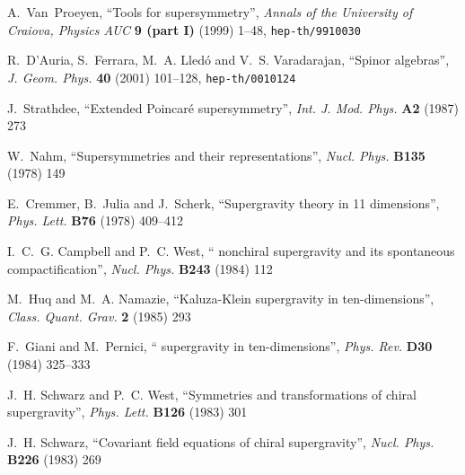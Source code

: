 \documentclass[a4paper,11pt,twoside]{article}
\begin{document}
\providecommand{\href}[2]{#2}\begingroup\raggedright\begin{thebibliography}{10}

{\sc A.~Van~Proeyen}, ``Tools for supersymmetry'',  {\sl Annals of the
  University of Craiova, Physics AUC} {\bf 9 (part I)} (1999) 1--48,
\href{http://www.arXiv.org/abs/hep-th/9910030}{{\tt hep-th/9910030}}

{\sc R.~D'Auria, S.~Ferrara, M.~A. Lled{\'o}  and V.~S. Varadarajan},
``Spinor
  algebras'',  {\sl J. Geom. Phys.} {\bf 40} (2001) 101--128,
\href{http://www.arXiv.org/abs/hep-th/0010124}{{\tt hep-th/0010124}}

{\sc J.~Strathdee}, ``Extended Poincar{\'e} supersymmetry'',  {\sl Int. J.
Mod.
  Phys.} {\bf A2} (1987)
273

{\sc W.~Nahm}, ``Supersymmetries and their representations'',  {\sl Nucl.
  Phys.} {\bf B135} (1978)
149

{\sc E.~Cremmer, B.~Julia  and J.~Scherk}, ``Supergravity theory in 11
  dimensions'',  {\sl Phys. Lett.} {\bf B76} (1978)
409--412

{\sc I.~C.~G. Campbell and P.~C. West}, ``\coordHE{}  \coordHE{} nonchiral
supergravity
  and its spontaneous compactification'',  {\sl Nucl. Phys.} {\bf B243} (1984)
112

{\sc M.~Huq and M.~A. Namazie}, ``Kaluza-Klein supergravity in
  ten-dimensions'',  {\sl Class. Quant. Grav.} {\bf 2} (1985)
293

{\sc F.~Giani and M.~Pernici}, ``\coordHE{} supergravity in ten-dimensions'',
{\sl
  Phys. Rev.} {\bf D30} (1984)
325--333

{\sc J.~H. Schwarz and P.~C. West}, ``Symmetries and transformations of
chiral
  \coordHE{}  \coordHE{} supergravity'',  {\sl Phys. Lett.} {\bf B126} (1983)
301

{\sc J.~H. Schwarz}, ``Covariant field equations of chiral \coordHE{}  \coordHE{}
  supergravity'',  {\sl Nucl. Phys.} {\bf B226} (1983)
269


\end{thebibliography}
\end{document}

